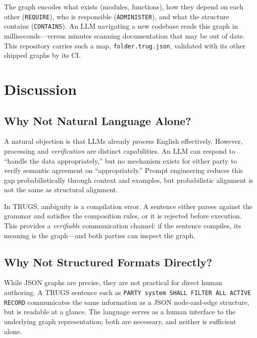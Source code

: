 \documentclass{article}
\begin{document}
The graph encodes what exists (modules, functions), how they depend on each other (\texttt{REQUIRE}), who is responsible (\texttt{ADMINISTER}), and what the structure contains (\texttt{CONTAINS}). An LLM navigating a new codebase reads this graph in milliseconds---versus minutes scanning documentation that may be out of date. This repository carries such a map, \texttt{folder.trug.json}, validated with its other shipped graphs by its CI.

\section{Discussion}

\subsection{Why Not Natural Language Alone?}

A natural objection is that LLMs already process English effectively. However, processing and \textit{verification} are distinct capabilities. An LLM can respond to ``handle the data appropriately,'' but no mechanism exists for either party to verify semantic agreement on ``appropriately.'' Prompt engineering reduces this gap probabilistically through context and examples, but probabilistic alignment is not the same as structural alignment.

In TRUGS, ambiguity is a compilation error. A sentence either parses against the grammar and satisfies the composition rules, or it is rejected before execution. This provides a \textit{verifiable} communication channel: if the sentence compiles, its meaning is the graph---and both parties can inspect the graph.

\subsection{Why Not Structured Formats Directly?}

While JSON graphs are precise, they are not practical for direct human authoring. A TRUGS sentence such as \texttt{PARTY system SHALL FILTER ALL ACTIVE RECORD} communicates the same information as a JSON node-and-edge structure, but is readable at a glance. The language serves as a human interface to the underlying graph representation; both are necessary, and neither is sufficient alone.
\end{document}
